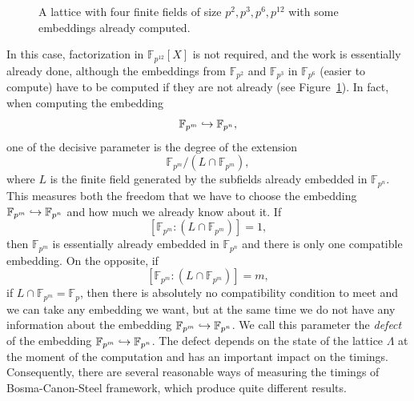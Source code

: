 \begin{figure}[h]
  \centering
  \caption{A lattice with four finite fields of size $p^2, p^3, p^6,
    p^{12}$ with some embeddings already computed.}
  \label{fig:example-F12}
\end{figure}
In this case, factorization in $\mathbb{F}_{p^{12}}[X]$ is not required, and the
work is essentially already done, although the embeddings from
$\mathbb{F}_{p^{2}}$ and $\mathbb{F}_{p^{3}}$ in $\mathbb{F}_{p^{6}}$ (easier
to compute) have to be computed if they are not already (see
Figure~\ref{fig:example-F12}).
In fact, when computing the embedding
\[
  \mathbb{F}_{p^{m}}\hookrightarrow\mathbb{F}_{p^{n}},
\]
one of the decisive parameter is the degree of the extension 
\[
  \mathbb{F}_{p^{m}}/(L\cap\mathbb{F}_{p^{m}}),
\]
where $L$ is the finite field generated by the subfields already embedded in
$\mathbb{F}_{p^{n}}$. This measures both the freedom that we have to choose the
embedding $\mathbb{F}_{p^{m}}\hookrightarrow\mathbb{F}_{p^{n}}$ and how much we already
know about it. If
\[
  \left[ \mathbb{F}_{p^{m}}:(L\cap\mathbb{F}_{p^{m}})\right]=1,
\]
then $\mathbb{F}_{p^{m}}$ is essentially already embedded in
$\mathbb{F}_{p^{n}}$ and there is only one compatible embedding. On the
opposite, if 
\[
  \left[ \mathbb{F}_{p^{m}}:(L\cap\mathbb{F}_{p^{m}})\right]=m,
\]
\ie if $L\cap\mathbb{F}_{p^{m}}=\mathbb{F}_p$, then there is absolutely no
compatibility condition to meet and we can take any embedding we want, but at
the same time we do not have any information about the embedding
$\mathbb{F}_{p^{m}}\hookrightarrow\mathbb{F}_{p^{n}}$. We call this parameter the
\emph{defect} of the embedding $\mathbb{F}_{p^{m}}\hookrightarrow\mathbb{F}_{p^{n}}$.
The defect depends on the state of the lattice $\Lambda$ at the moment of the
computation and has an important impact on the timings.
Consequently, there are several reasonable ways of measuring the timings
of Bosma-Canon-Steel framework, which produce quite different results.

